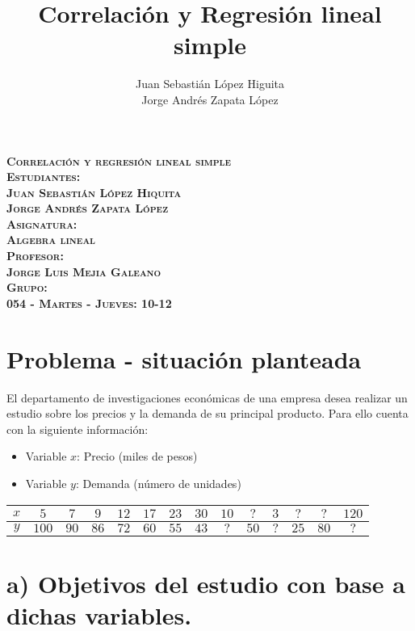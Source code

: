\documentclass[12pt]{article}
\title{Correlación y Regresión lineal simple}
\author{Juan Sebastián López Higuita\\ Jorge Andrés Zapata López}
\begin{document}
	\begin{titlepage}
		\centering
		{\Huge \textsc{\textbf{Correlación y regresión lineal simple}}\\}
		\vspace{50pt}
		{\large \textsc{\textbf{Estudiantes:\\ Juan Sebastián López Hiquita \\ Jorge Andrés Zapata López}}} \\
		\vspace{50pt}
		{\large \textsc{\textbf{Asignatura:\\ Algebra lineal}}} \\
		\vspace{50pt}
		{\large \textsc{\textbf{Profesor:\\ Jorge Luis Mejia Galeano}}} \\
		\vspace{50pt}
		{\large \textsc{\textbf{Grupo:\\ 054 - Martes - Jueves: 10-12}}}
	\end{titlepage}
	
	\section*{Problema - situación planteada}
	El departamento de investigaciones económicas de una empresa desea realizar un estudio sobre los precios y la demanda de su principal producto. Para ello cuenta con la siguiente información:
	
	\begin{itemize}
		\item Variable $x$: Precio (miles de pesos)
		\item Variable $y$: Demanda (número de unidades)
	\end{itemize}
	
	\begin{tabular}{|c|c|c|c|c|c|c|c|c|c|c|c|c|c|}
		\hline
		$x$ & $5$ & $7$ & $9$ & $12$ & $17$ & $23$ & $30$ & $10$ & $?$ & $3$ & $?$ & $?$ & $120$ \\ \hline
		$y$ & $100$ & $90$ & $86$ & $72$ & $60$ & $55$ & $43$ & $?$ & $50$ & $?$ & $25$ & $80$ & $?$ \\ \hline
	\end{tabular}
	
	\section*{a) Objetivos del estudio con base a dichas variables.}
	
\end{document}
